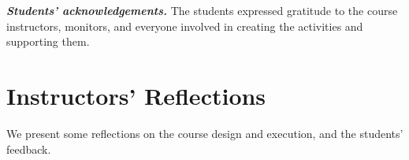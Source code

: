 \documentclass[sigconf]{acmart}
\begin{document}
\textit{\textbf{Students' acknowledgements.}}
The students expressed gratitude to the course instructors, monitors, and everyone involved in creating the activities and supporting them. 


\section{Instructors' Reflections} \label{sec:reflections}

We present some reflections on the course design and execution, and the students' feedback.
\end{document}
